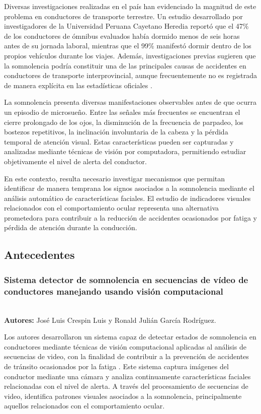 \documentclass[conference]{IEEEtran}
\begin{document}
Diversas investigaciones realizadas en el país han evidenciado la magnitud de este problema en conductores de transporte terrestre. Un estudio desarrollado por investigadores de la Universidad Peruana Cayetano Heredia reportó que el 47\% de los conductores de ómnibus evaluados había dormido menos de seis horas antes de su jornada laboral, mientras que el 99\% manifestó dormir dentro de los propios vehículos durante los viajes. Además, investigaciones previas sugieren que la somnolencia podría constituir una de las principales causas de accidentes en conductores de transporte interprovincial, aunque frecuentemente no es registrada de manera explícita en las estadísticas oficiales \parencite{rosales2009}.

La somnolencia presenta diversas manifestaciones observables antes de que ocurra un episodio de microsueño. Entre las señales más frecuentes se encuentran el cierre prolongado de los ojos, la disminución de la frecuencia de parpadeo, los bostezos repetitivos, la inclinación involuntaria de la cabeza y la pérdida temporal de atención visual. Estas características pueden ser capturadas y analizadas mediante técnicas de visión por computadora, permitiendo estudiar objetivamente el nivel de alerta del conductor.

En este contexto, resulta necesario investigar mecanismos que permitan identificar de manera temprana los signos asociados a la somnolencia mediante el análisis automático de características faciales. El estudio de indicadores visuales relacionados con el comportamiento ocular representa una alternativa prometedora para contribuir a la reducción de accidentes ocasionados por fatiga y pérdida de atención durante la conducción.


\subsection{Antecedentes}

\subsubsection{\textbf{Sistema detector de somnolencia en secuencias de vídeo de conductores manejando usando visión computacional}}\mbox{}\\


\textbf{Autores:} José Luis Crespin Luis y Ronald Julián García Rodríguez.

Los autores desarrollaron un sistema capaz de detectar estados de somnolencia en conductores mediante técnicas de visión computacional aplicadas al análisis de secuencias de video, con la finalidad de contribuir a la prevención de accidentes de tránsito ocasionados por la fatiga \parencite{crespin2019}.
Este sistema captura imágenes del conductor mediante una cámara y analiza continuamente características faciales relacionadas con el nivel de alerta. A través del procesamiento de secuencias de video, identifica patrones visuales asociados a la somnolencia, principalmente aquellos relacionados con el comportamiento ocular.
\end{document}
